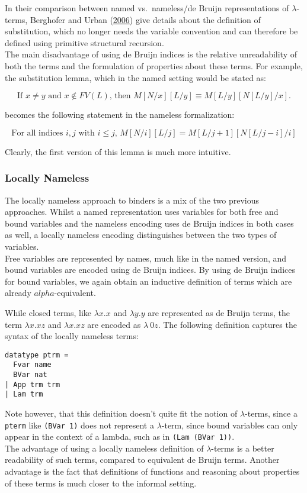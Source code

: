 \documentclass[a4paper, 12pt, twoside]{style/ociamthesis}
\theoremstyle{plain}
\theoremstyle{definition}
\theoremstyle{remark}
\begin{document}
In their comparison between named vs.~nameless/de Bruijn representations
of \(\lambda\)-terms, Berghofer and Urban
(\protect\hyperlink{ref-berghofer06}{2006}) give details about the
definition of substitution, which no longer needs the variable
convention and can therefore be defined using primitive structural
recursion.\\
The main disadvantage of using de Bruijn indices is the relative
unreadability of both the terms and the formulation of properties about
these terms. For example, the substitution lemma, which in the named
setting would be stated as:

\[\text{If }x \neq y\text{ and }x \not\in FV(L)\text{, then }
M[N/x][L/y] \equiv M[L/y][N[L/y]/x].\]

becomes the following statement in the nameless formalization:

\[\text{For all indices }i, j\text{ with }i \leq j\text{, }M[N/i][L/j] = M[L/j + 1][N[L/j - i]/i]\]

Clearly, the first version of this lemma is much more intuitive.

\subsubsection{Locally Nameless}\label{locally-nameless}

The locally nameless approach to binders is a mix of the two previous
approaches. Whilst a named representation uses variables for both free
and bound variables and the nameless encoding uses de Bruijn indices in
both cases as well, a locally nameless encoding distinguishes between
the two types of variables.\\
Free variables are represented by names, much like in the named version,
and bound variables are encoded using de Bruijn indices. By using de
Bruijn indices for bound variables, we again obtain an inductive
definition of terms which are already \(alpha\)-equivalent.

While closed terms, like \(\lambda x.x\) and \(\lambda y.y\) are
represented as de Bruijn terms, the term \(\lambda x.xz\) and
\(\lambda x.xz\) are encoded as \(\lambda\ 0z\). The following
definition captures the syntax of the locally nameless terms:

\begin{verbatim}
datatype ptrm =
  Fvar name
  BVar nat
| App trm trm
| Lam trm
\end{verbatim}

Note however, that this definition doesn't quite fit the notion of
\(\lambda\)-terms, since a \texttt{pterm} like \texttt{(BVar 1)} does
not represent a \(\lambda\)-term, since bound variables can only appear
in the context of a lambda, such as in \texttt{(Lam (BVar 1))}.\\
The advantage of using a locally nameless definition of
\(\lambda\)-terms is a better readability of such terms, compared to
equivalent de Bruijn terms. Another advantage is the fact that
definitions of functions and reasoning about properties of these terms
is much closer to the informal setting.
\end{document}
